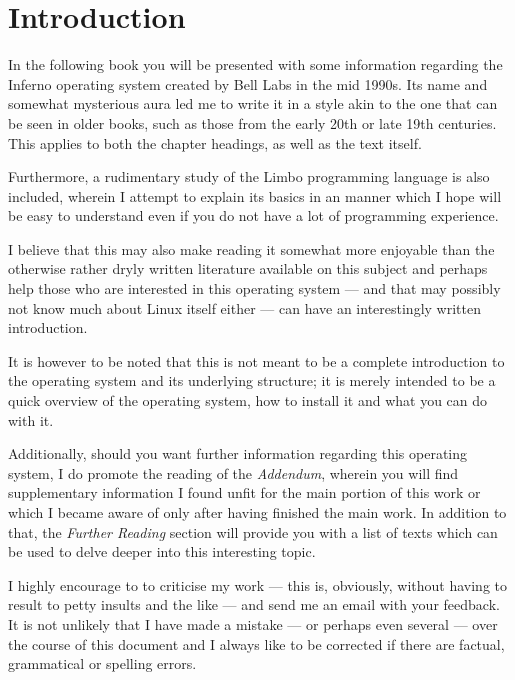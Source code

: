 \documentclass[a5paper,twoside,12pt]{report}
\begin{document}
\tableofcontents
\newpage

\chapter*{Introduction}
In the following book you will be presented with some information regarding the Inferno operating system created by Bell Labs in the mid 1990s. Its name and somewhat mysterious aura led me to write it in a style akin to the one that can be seen in older books, such as those from the early 20th or late 19th centuries. This applies to both the chapter headings, as well as the text itself.

Furthermore, a rudimentary study of the Limbo programming language is also included, wherein I attempt to explain its basics in an manner which I hope will be easy to understand even if you do not have a lot of programming experience.

I believe that this may also make reading it somewhat more enjoyable than the otherwise rather dryly written literature available on this subject and perhaps help those who are interested in this operating system — and that may possibly not know much about Linux itself either — can have an interestingly written introduction.

It is however to be noted that this is not meant to be a complete introduction to the operating system and its underlying structure; it is merely intended to be a quick overview of the operating system, how to install it and what you can do with it.

Additionally, should you want further information regarding this operating system, I do promote the reading of the \textit{Addendum}, wherein you will find supplementary information I found unfit for the main portion of this work or which I became aware of only after having finished the main work. In addition to that, the \textit{Further Reading} section will provide you with a list of texts which can be used to delve deeper into this interesting topic.

I highly encourage to to criticise my work — this is, obviously, without having to result to petty insults and the like — and send me an email with your feedback. It is not unlikely that I have made a mistake — or perhaps even several — over the course of this document and I always like to be corrected if there are factual, grammatical or spelling errors.
\end{document}
